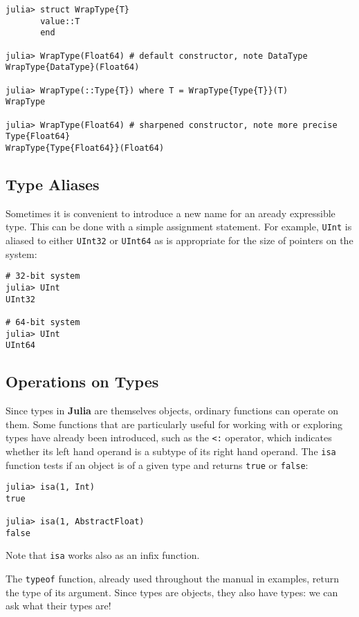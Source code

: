 \documentclass[
]{article}
\begin{document}
\begin{verbatim}
julia> struct WrapType{T}
       value::T
       end

julia> WrapType(Float64) # default constructor, note DataType
WrapType{DataType}(Float64)

julia> WrapType(::Type{T}) where T = WrapType{Type{T}}(T)
WrapType

julia> WrapType(Float64) # sharpened constructor, note more precise Type{Float64}
WrapType{Type{Float64}}(Float64)
\end{verbatim}

\hypertarget{type-aliases}{%
\subsection{Type Aliases}\label{type-aliases}}

Sometimes it is convenient to introduce a new name for an aready
expressible type. This can be done with a simple assignment statement.
For example, \texttt{UInt} is aliased to either \texttt{UInt32} or
\texttt{UInt64} as is appropriate for the size of pointers on the
system:

\begin{verbatim}
# 32-bit system
julia> UInt
UInt32

# 64-bit system
julia> UInt
UInt64
\end{verbatim}

\hypertarget{operations-on-types}{%
\subsection{Operations on Types}\label{operations-on-types}}

Since types in \textbf{Julia} are themselves objects, ordinary functions
can operate on them. Some functions that are particularly useful for
working with or exploring types have already been introduced, such as
the \texttt{\textless{}:} operator, which indicates whether its left
hand operand is a subtype of its right hand operand. The \texttt{isa}
function tests if an object is of a given type and returns \texttt{true}
or \texttt{false}:

\begin{verbatim}
julia> isa(1, Int)
true

julia> isa(1, AbstractFloat)
false
\end{verbatim}

Note that \texttt{isa} works also as an infix function.

The \texttt{typeof} function, already used throughout the manual in
examples, return the type of its argument. Since types are objects, they
also have types: we can ask what their types are!
\end{document}
